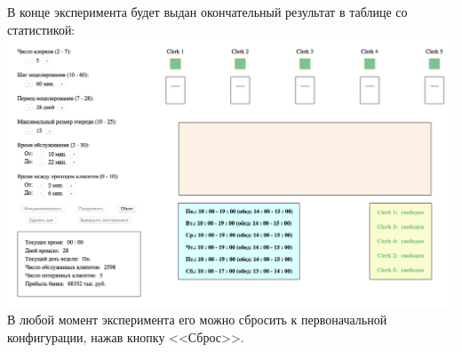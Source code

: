 \documentclass[oneside,final,12pt]{article}
\begin{document}
\newpage

В конце эксперимента будет выдан окончательный результат в таблице со статистикой:\\

 \includegraphics[width=150mm]{ended.png}\\

В любой момент эксперимента его можно сбросить к первоначальной конфигурации, нажав кнопку <<Сброс>>.\\

\newpage
\end{document}
